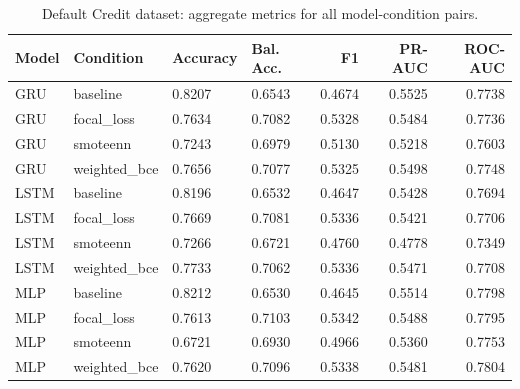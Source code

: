 \documentclass[11pt,a4paper]{article}
\begin{document}
\begin{table}[htbp]
\centering
\scriptsize
\caption{Default Credit dataset: aggregate metrics for all model-condition pairs.}
\label{tab:default-all}
\begin{tabular}{llllrrr}
\toprule
Model & Condition & Accuracy & Bal. Acc. & F1 & PR-AUC & ROC-AUC \\
\midrule
GRU & baseline & 0.8207 & 0.6543 & 0.4674 & 0.5525 & 0.7738 \\
GRU & focal\_loss & 0.7634 & 0.7082 & 0.5328 & 0.5484 & 0.7736 \\
GRU & smoteenn & 0.7243 & 0.6979 & 0.5130 & 0.5218 & 0.7603 \\
GRU & weighted\_bce & 0.7656 & 0.7077 & 0.5325 & 0.5498 & 0.7748 \\
LSTM & baseline & 0.8196 & 0.6532 & 0.4647 & 0.5428 & 0.7694 \\
LSTM & focal\_loss & 0.7669 & 0.7081 & 0.5336 & 0.5421 & 0.7706 \\
LSTM & smoteenn & 0.7266 & 0.6721 & 0.4760 & 0.4778 & 0.7349 \\
LSTM & weighted\_bce & 0.7733 & 0.7062 & 0.5336 & 0.5471 & 0.7708 \\
MLP & baseline & 0.8212 & 0.6530 & 0.4645 & 0.5514 & 0.7798 \\
MLP & focal\_loss & 0.7613 & 0.7103 & 0.5342 & 0.5488 & 0.7795 \\
MLP & smoteenn & 0.6721 & 0.6930 & 0.4966 & 0.5360 & 0.7753 \\
MLP & weighted\_bce & 0.7620 & 0.7096 & 0.5338 & 0.5481 & 0.7804 \\
\bottomrule
\end{tabular}
\end{table}
\end{document}
